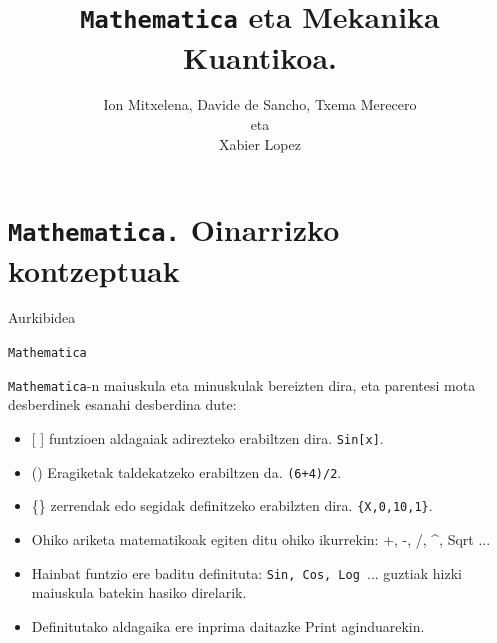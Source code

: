 \documentclass[xcolor=x11names,table]{beamer}
\title{{\tt Mathematica} eta Mekanika Kuantikoa.  }
\author{Ion Mitxelena, Davide de Sancho, Txema Merecero \\ eta \\ Xabier Lopez}
\begin{document}
\maketitle


\section{{\tt Mathematica.} Oinarrizko kontzeptuak }
\begin{frame}{Aurkibidea}

\tableofcontents{}
\end{frame}
\begin{frame}{\tt Mathematica}
	
{\tt Mathematica}-n maiuskula eta minuskulak bereizten dira, eta parentesi mota 
desberdinek esanahi desberdina dute:

\begin{itemize}
	\item<2-> {[ ]} funtzioen aldagaiak adirezteko erabiltzen dira. {\tt Sin[x]}.
			 
	\item<3-> () Eragiketak taldekatzeko erabiltzen da. {\tt (6+4)/2}.
	\item<4-> \{\} zerrendak edo segidak definitzeko erabilzten dira. {\tt \{X,0,10,1\}}.
	\item<5-> Ohiko ariketa matematikoak egiten ditu ohiko ikurrekin: { +, -, /, \textasciicircum , Sqrt }...
	\item<6-> Hainbat funtzio ere baditu definituta: {\tt Sin, Cos, Log }... 
		guztiak hizki maiuskula batekin hasiko direlarik. 
	\item<7-> Definitutako aldagaika ere inprima daitazke Print aginduarekin.
\end{itemize}

\end{frame}
\end{document}
